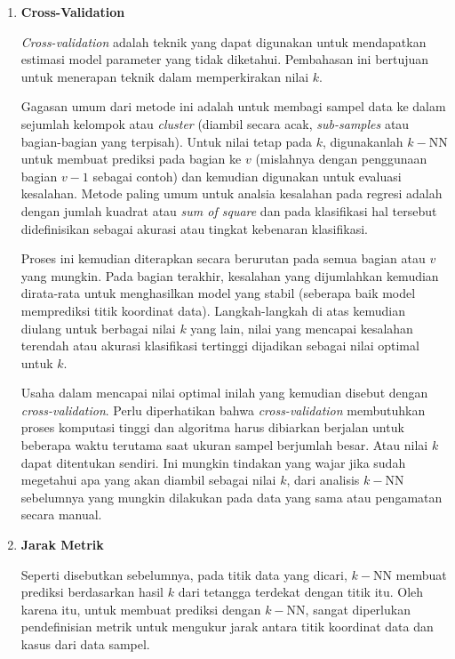 \begin{subs}
\begin{enumerate}[label=\textbf{\alph*).}]
		\item \textbf{Cross-Validation}
		
		\textit{Cross-validation} adalah teknik yang dapat digunakan untuk mendapatkan estimasi model parameter yang tidak diketahui. Pembahasan ini bertujuan untuk menerapan teknik dalam memperkirakan nilai $k$. 
		\vspace{1ex}
		
		Gagasan umum dari metode ini adalah untuk membagi sampel data ke dalam sejumlah kelompok atau \textit{cluster} (diambil secara acak, \textit{sub-samples} atau bagian-bagian yang terpisah). Untuk nilai tetap pada $k$, digunakanlah $k-$NN untuk membuat prediksi pada bagian ke $v$ (mislahnya dengan penggunaan bagian $v-1$ sebagai contoh) dan kemudian digunakan untuk evaluasi kesalahan. Metode paling umum untuk analsia kesalahan pada regresi adalah dengan jumlah kuadrat atau \textit{sum of square} dan pada klasifikasi hal tersebut didefinisikan sebagai akurasi atau tingkat kebenaran klasifikasi.
		\vspace{1ex}
		
		Proses ini kemudian diterapkan secara berurutan pada semua bagian atau $v$ yang mungkin. Pada bagian terakhir, kesalahan yang dijumlahkan kemudian dirata-rata untuk menghasilkan model yang stabil (seberapa baik model memprediksi titik koordinat data). Langkah-langkah di atas kemudian diulang untuk berbagai nilai $k$ yang lain, nilai yang mencapai kesalahan terendah atau akurasi klasifikasi tertinggi dijadikan sebagai nilai optimal untuk $k$. 
		\vspace{1ex}
		
		Usaha dalam mencapai nilai optimal inilah yang kemudian disebut dengan \textit{cross-validation}. Perlu diperhatikan bahwa \textit{cross-validation} membutuhkan proses komputasi tinggi dan algoritma harus dibiarkan berjalan untuk beberapa waktu terutama saat ukuran sampel berjumlah besar. Atau nilai $k$ dapat ditentukan sendiri. Ini mungkin tindakan yang wajar jika sudah megetahui apa yang akan diambil sebagai nilai $k$, dari analisis $k-$NN sebelumnya yang mungkin dilakukan pada data yang sama atau pengamatan secara manual.
		
		\item \textbf{Jarak Metrik}
		
		Seperti disebutkan sebelumnya, pada titik data yang dicari, $k-$NN membuat prediksi berdasarkan hasil $k$ dari tetangga terdekat dengan titik itu. Oleh karena itu, untuk membuat prediksi dengan $k-$NN, sangat diperlukan pendefinisian metrik untuk mengukur jarak antara titik koordinat data dan kasus dari data sampel. 
		\vspace{1ex}
		

\end{enumerate}
\end{subs}
